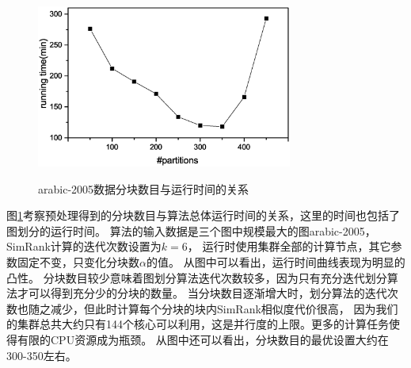 \documentclass[master]{njuthesis}
\begin{document}
\begin{figure}[h]
  \centering
  \includegraphics[width= 0.75\textwidth]{figure/ch3_partition_time.eps}\\
  \caption{arabic-2005数据分块数目与运行时间的关系}
  \label{fig:ch3_partition_time}
\end{figure}

图\ref{fig:ch3_partition_time}考察预处理得到的分块数目与算法总体运行时间的关系，这里的时间也包括了图划分的运行时间。
算法的输入数据是三个图中规模最大的图arabic-2005，SimRank计算的迭代次数设置为$k=6$，
运行时使用集群全部的计算节点，其它参数固定不变，只变化分块数$\alpha$的值。
从图中可以看出，运行时间曲线表现为明显的凸性。
分块数目较少意味着图划分算法迭代次数较多，因为只有充分迭代划分算法才可以得到充分少的分块的数量。
当分块数目逐渐增大时，划分算法的迭代次数也随之减少，但此时计算每个分块的块内SimRank相似度代价很高，
因为我们的集群总共大约只有144个核心可以利用，这是并行度的上限。更多的计算任务使得有限的CPU资源成为瓶颈。
从图中还可以看出，分块数目的最优设置大约在300-350左右。
\end{document}
